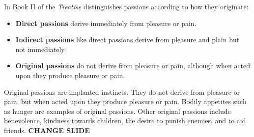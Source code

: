 
In Book II of the \emph{Treatise} distinguishes passions according to how they originate:

\begin{itemize}
    \item \textbf{Direct passions} derive immediately from pleasure or pain. \change
    \item \textbf{Indirect passions} like direct passions derive from pleasure and plain but not immediately. \change
    \item \textbf{Original passions} do not derive from pleasure or pain, although when acted upon they produce pleasure or pain. \change
\end{itemize}

Original passions are implanted instincts. They do not derive from pleasure or pain, but when acted upon they produce pleasure or pain. Bodily appetites such as hunger are examples of original passions. Other original passions include benevolence, kindness towards children, the desire to punish enemies, and to aid friends. \textbf{CHANGE SLIDE}

